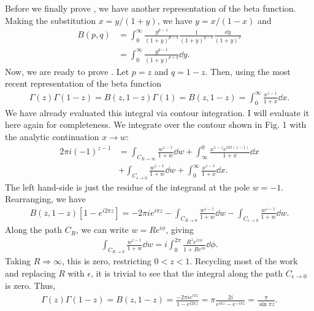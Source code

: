 Before we finally prove , we have another representation of the beta function.
Making the substitution $x = y/(1+y)$, we have $y = x/(1-x)$ and
\begin{align}
    B(p,q) &= \int_{0}^{\infty} \frac{y^{p-1}}{(1+y)^{p-1}} \frac{1}{(1+y)^{q-1}} \frac{\dd{y}}{(1+y)^2} \nonumber \\
           &= \int_{0}^{\infty} \frac{y^{p-1}}{(1+y)^{p+q}} \dd{y}
.\end{align}
Now, we are ready to prove .
Let $p = z$ and $q = 1-z$.
Then, using the most recent representation of the beta function 
\begin{eqnarray}
    \Gamma(z)\Gamma(1-z) = B(z,1-z) \Gamma(1) = B(z,1-z) = \int_{0}^{\infty} \frac{x^{z-1}}{1+x} \dd{x}
.\end{eqnarray}
We have already evaluated this integral via contour integration.
I will evaluate it here again for completeness.
We integrate over the contour shown in {\color{red} Fig. 1} with the analytic continuation $x \rightarrow w$:
\begin{align}
    2 \pi i (-1)^{z-1} &= \int_{C_{R \rightarrow \infty}} \frac{w^{z-1}}{1+w} \dd{w} + \int_{\infty}^{0} \frac{x^{1-z} e^{i 2\pi(z-1)}}{1+x} \dd{x} \nonumber \\
             &+ \int_{C_{\epsilon\rightarrow 0}} \frac{w^{z-1}}{1+w} \dd{w} + \int_{0}^{\infty} \frac{x^{z-1}}{1+x} \dd{x}
.\end{align}
The left hand-side is just the residue of the integrand at the pole $w = -1$.
Rearranging, we have
\begin{align}
    B(z,1-z) [ 1 - e^{i 2 \pi z} ] = -2 \pi i e^{i \pi z} - \int_{C_{R \rightarrow 0}} \frac{w^{z-1}}{1 + w} \dd{w} - \int_{C_{\epsilon \rightarrow 0}} \frac{w^{z-1}}{1 + w} \dd{w}
.\end{align}
Along the path $C_{R}$, we can write $w = R e^{i \phi}$, giving
\begin{eqnarray}
    \int_{C_{R \rightarrow 0}} \frac{w^{z-1}}{1 + w} \dd{w} = i \int_{0}^{2\pi} \frac{R^{z} e^{iz\phi}}{1 + R e^{i\phi}} \dd{\phi}
.\end{eqnarray}
Taking $R \Rightarrow \infty$, this is zero, restricting $0 < z < 1$.
Recycling most of the work and replacing $R$ with $\epsilon$, it is trivial to see that the integral along the path $C_{\epsilon \rightarrow 0}$ is zero.
Thus,
\begin{eqnarray}
    \Gamma(z) \Gamma(1-z) = B(z,1-z) = \frac{-2 \pi i e^{i \pi z}}{1 - e^{i 2 \pi z}} = \pi \frac{2i}{e^{i \pi z} - e^{-i \pi z}} = \frac{\pi}{\sin{\pi z}}
.\end{eqnarray}
